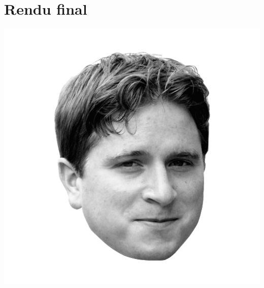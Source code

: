 \documentclass[12pt,a4paper]{article}
\begin{document}
\section{Rendu final}
\includegraphics[scale=1]{../img/Kappa_off.png}
\end{document}

